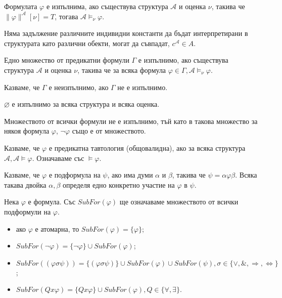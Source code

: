 \documentclass{article}
\begin{document}
\begin{mydef}
Формулата $\varphi$ е изпълнима, ако съществува структура $\mathcal{A}$ и оценка $\nu$, такива че $\|\varphi\|^\mathcal{A}[\nu] = T$, тогава $\mathcal{A} \models_\nu \varphi$.

\begin{remark}
Няма задължение различните индивидни константи да бъдат интерпретирани в структурата като различни обекти, могат да съвпадат, $c^\mathcal{A} \in A$.
\end{remark}
\end{mydef}

\begin{mydef}
Едно множество от предикатни формули $\Gamma$ е изпълнимо, ако съществува структура $\mathcal{A}$ и оценка $\nu$, такива че за всяка формула $\varphi \in \Gamma, \mathcal{A} \models_\nu \varphi$.

Казваме, че $\Gamma$ е неизпълнимо, ако $\Gamma$ не е изпълнимо.

\begin{remark}
$\varnothing$ е изпълнимо за всяка структура и всяка оценка.
\end{remark}

\begin{remark}
Множеството от всички формули не е изпълнимо, тъй като в такова множество за някоя формула $\varphi$, $\neg\varphi$ също е от множеството.
\end{remark}

\end{mydef}

\begin{mydef}
Казваме, че $\varphi$ е предикатна тавтология (общовалидна), ако за всяка структура $\mathcal{A}, \mathcal{A} \models \varphi$. Означаваме със $\models \varphi$.
\end{mydef}

\begin{mydef}[Подформула]
Казваме, че $\varphi$ е подформула на $\psi$, ако има думи $\alpha$ и $\beta$, такива че $\psi = \alpha\varphi\beta$. Всяка такава двойка $\alpha, \beta$ определя едно конкретно участие на $\varphi$ в $\psi$.
\end{mydef}

\begin{mydef}
Нека $\varphi$ е формула. Със $SubFor(\varphi)$ ще означаваме множеството от всички подформули на $\varphi$.
\begin{itemize}
\item ако $\varphi$ е атомарна, то $SubFor(\varphi) = \{\varphi\}$;
\item $SubFor(\neg\varphi) = \{\neg\varphi\} \cup SubFor(\varphi)$;
\item $SubFor((\varphi \sigma \psi)) = \{(\varphi \sigma \psi)\} \cup SubFor(\varphi) \cup SubFor(\psi), \sigma \in \{\lor, \&, \Rightarrow, \Leftrightarrow\}$;
\item $SubFor(Qx\varphi) = \{Qx\varphi\} \cup SubFor(\varphi), Q \in \{\forall, \exists\}$.
\end{itemize}
\end{mydef}
\end{document}
